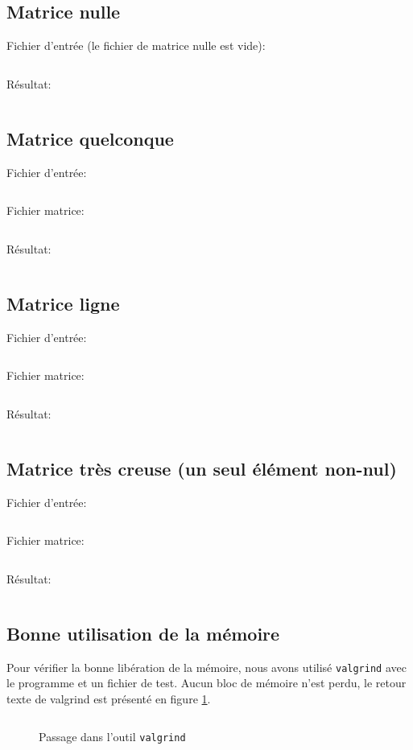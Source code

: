 \subsection{Matrice nulle}
	Fichier d'entrée (le fichier de matrice nulle est vide):
	\inputminted[frame=single,label=test\_nulle]{text}{../tests/test_nulle}
	Résultat:
	\inputminted[frame=single,label=Résultat matrice nulle]{text}{../tests/resultat_test_nulle}
\subsection{Matrice quelconque}
	Fichier d'entrée:
	\inputminted[frame=single,label=test\_1]{text}{../tests/test_1}
	Fichier matrice:
	\inputminted[frame=single,label=matrice\_1]{text}{../tests/matrice_1}
	Résultat:
	\inputminted[frame=single,label=Résultat matrice quelconque,tabsize=4]{text}{../tests/resultat_test_1}
\subsection{Matrice ligne}
	Fichier d'entrée:
	\inputminted[frame=single,label=test\_2]{text}{../tests/test_2}
	Fichier matrice:
	\inputminted[frame=single,label=matrice\_2]{text}{../tests/matrice_2}
	Résultat:
	\inputminted[frame=single,label=Résultat matrice ligne,tabsize=2,breaklines=true]{text}{../tests/resultat_test_2}
\subsection{Matrice très creuse (un seul élément non-nul)}
	\label{subs:mat_creuse}
	Fichier d'entrée:
	\inputminted[frame=single,label=test\_3]{text}{../tests/test_3}
	Fichier matrice:
	\inputminted[frame=single,label=matrice\_3]{text}{../tests/matrice_3}
	Résultat:
	\inputminted[frame=single,label=Résultat matrice très creuse,tabsize=2,breaklines=true]{text}{../tests/resultat_test_3}
\newpage
\subsection{Bonne utilisation de la mémoire}
	Pour vérifier la bonne libération de la mémoire, nous avons utilisé \texttt{valgrind} avec le programme et un fichier de test. Aucun bloc de mémoire n'est perdu, le retour texte de valgrind est présenté en figure \ref{fig:valgrind}.
	\begin{figure}[H]
	  \inputminted[frame=single,label=Resultat Valgrind]{text}{../tests/valgrind_test_1}
	  \caption{Passage dans l'outil \texttt{valgrind}}
	  \label{fig:valgrind}
	\end{figure}

